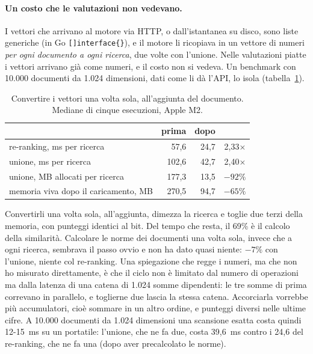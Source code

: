 \paragraph{Un costo che le valutazioni non vedevano.} I vettori che arrivano al
motore via HTTP, o dall'istantanea su disco, sono liste generiche
(in Go \texttt{[]interface\{\}}), e il motore li ricopiava in un vettore di numeri
\emph{per ogni documento a ogni ricerca}, due volte con l'unione. Nelle valutazioni
piatte i vettori arrivano già come numeri, e il costo non si vedeva. Un benchmark
con 10.000 documenti da 1.024 dimensioni, dati come li dà l'API, lo isola
(tabella~\ref{tab:costo}).

\begin{table}[ht]
  \centering
  \begin{tabular}{lrrr}
    \toprule
    & prima & dopo & \\
    \midrule
    re-ranking, ms per ricerca & 57,6 & 24,7 & 2,33$\times$ \\
    unione, ms per ricerca & 102,6 & 42,7 & 2,40$\times$ \\
    unione, MB allocati per ricerca & 177,3 & 13,5 & $-92\%$ \\
    memoria viva dopo il caricamento, MB & 270,5 & 94,7 & $-65\%$ \\
    \bottomrule
  \end{tabular}
  \caption{Convertire i vettori una volta sola, all'aggiunta del documento. Mediane
  di cinque esecuzioni, Apple M2.}
  \label{tab:costo}
\end{table}

Convertirli una volta sola, all'aggiunta, dimezza la ricerca e toglie due terzi
della memoria, con punteggi identici al bit. Del tempo che resta, il 69\% è il
calcolo della similarità. Calcolare le norme dei documenti una volta sola, invece
che a ogni ricerca, sembrava il passo ovvio e non ha dato quasi niente: $-7\%$ con
l'unione, niente col re-ranking. Una spiegazione che regge i numeri, ma che non ho
misurato direttamente, è che il ciclo non è limitato dal numero di operazioni ma
dalla latenza di una catena di 1.024 somme dipendenti: le tre somme di prima correvano in parallelo, e toglierne due
lascia la stessa catena. Accorciarla vorrebbe più accumulatori, cioè sommare in un
altro ordine, e punteggi diversi nelle ultime cifre. A 10.000 documenti da 1.024
dimensioni una scansione esatta costa quindi 12-15~ms su un portatile:
l'unione, che ne fa due, costa 39,6~ms contro i 24,6 del re-ranking, che ne fa una (dopo aver precalcolato le norme).


